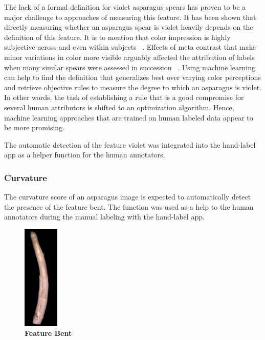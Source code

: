 \bigskip
The lack of a formal definition for violet asparagus spears has proven to be a major challenge to approaches of measuring this feature. It has been shown that directly measuring whether an asparagus spear is violet heavily depends on the definition of this feature. It is to mention that color impression is highly subjective across and even within subjects ~\citep{luo2000review}. Effects of meta contrast that make minor variations in color more visible arguably affected the attribution of labels when many similar spears were assessed in succession ~\citep{reeves1981metacontrast}. Using machine learning can help to find the definition that generalizes best over varying color perceptions and retrieve objective rules to measure the degree to which an asparagus is violet. In other words, the task of establishing a rule that is a good compromise for several human attributors is shifted to an optimization algorithm. Hence, machine learning approaches that are trained on human labeled data appear to be more promising.

The automatic detection of the feature violet was integrated into the hand-label app as a helper function for the human annotators.


\subsubsection{Curvature}
\label{subsec:Curvature}

The curvature score of an asparagus image is expected to automatically detect the presence of the feature bent. The function was used as a help to the human annotators during the manual labeling with the hand-label app.

\begin{figure}
  \begin{center}
    \includegraphics[width=0.15\textwidth]{Figures/chapter03/example_img_bent.png}
  \end{center}
  \vspace{-15pt}
  \caption[Example Image Feature Bent]{ \textbf{Feature Bent}~~~~~~~~}
  \label{fig:ExampleBent}
\end{figure}


